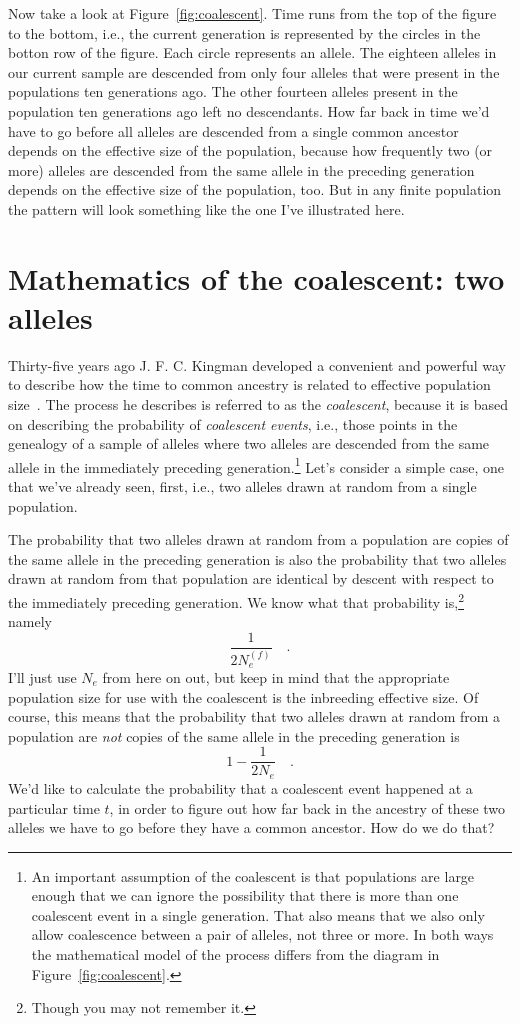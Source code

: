 \documentclass[12pt]{article}
\begin{document}
Now take a look at Figure~\ref{fig:coalescent}. Time runs from the top
of the figure to the bottom, i.e., the current generation is
represented by the circles in the botton row of the figure. Each
circle represents an allele. The eighteen alleles in our current
sample are descended from only four alleles that were present in the
populations ten generations ago. The other fourteen alleles present in
the population ten generations ago left no descendants. How far back
in time we'd have to go before all alleles are descended from a single
common ancestor depends on the effective size of the population,
because how frequently two (or more) alleles are descended from the
same allele in the preceding generation depends on the effective size
of the population, too. But in any finite population the pattern will
look something like the one I've illustrated here.

\section*{Mathematics of the coalescent: two
  alleles}

Thirty-five years ago J. F. C. Kingman developed a convenient and
powerful way to describe how the time to common ancestry is related to
effective population
size~\cite{Kingman-1982-genealogy,Kingman-1982-coalescent}. The
process he describes is referred to as the {\it coalescent}, because
it is based on describing the probability of {\it coalescent
  events}, i.e., those points in the
genealogy of a sample of alleles where two alleles are descended from
the same allele in the immediately preceding generation.\footnote{An
  important assumption of the coalescent is that populations are large
  enough that we can ignore the possibility that there is more than
  one coalescent event in a single generation. That also means that we
  also only allow coalescence between a pair of alleles, not three or
  more. In both ways the mathematical model of the process differs
  from the diagram in Figure~\ref{fig:coalescent}.}  Let's consider a
simple case, one that we've already seen, first, i.e., two alleles
drawn at random from a single population.

The probability that two alleles drawn at random from a population are
copies of the same allele in the preceding generation is also the
probability that two alleles drawn at random from that population are
identical by descent with respect to the immediately preceding
generation. We know what that probability is,\footnote{Though you may
not remember it.} namely
\[
\frac{1}{2N_e^{(f)}} \quad .
\]
I'll just use $N_e$ from here on out, but keep in mind that the
appropriate population size for use with the coalescent is the
inbreeding effective size. Of course, this means that the probability
that two alleles drawn at random from a population are {\it not\/}
copies of the same allele in the preceding generation is
\[
1 - \frac{1}{2N_e} \quad .
\]
We'd like to calculate the probability that a coalescent event
happened at a particular time $t$, in order to figure out how far back
in the ancestry of these two alleles we have to go before they have a
common ancestor. How do we do that?
\end{document}
